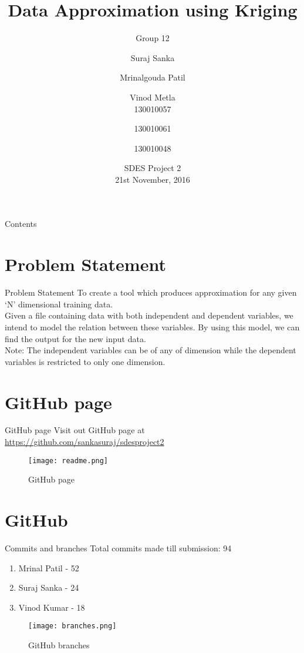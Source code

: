 \documentclass{beamer}
\title[]{Data Approximation using Kriging}
\subtitle{Group 12}
\author[]{Suraj Sanka \and Mrinalgouda Patil \and Vinod Metla\\
		130010057 \hspace{0.5cm} \and 130010061 \hspace{0.5cm} \and 130010048}
\date[]{SDES Project 2 \\ 21st November, 2016}
\begin{document}
\begin{frame}
  \titlepage
\end{frame}

\begin{frame}{Contents}
  \tableofcontents
\end{frame}

\section{Problem Statement}

\begin{frame}{Problem Statement}
\justifying
To create a tool which produces approximation for any given `N' dimensional training data.\\[0.2in]
Given a file containing data with both independent and dependent variables, we intend to model the relation between these variables. By using this model, we can find the output for the new input data.\\[0.4in] 
Note: The independent variables can be of any of dimension while the dependent variables is restricted to only one dimension.
\end{frame}


\section{GitHub page}

\begin{frame}{GitHub page}
Visit out GitHub page at \url{https://github.com/sankasuraj/sdesproject2}
\begin{figure}[H]
	\texttt{[image: readme.png]}
	\caption{GitHub page}
\end{figure}

\end{frame}

\section{GitHub}
\begin{frame}{Commits and branches}
Total commits made till submission: 94
\begin{enumerate}
	\item Mrinal Patil - 52
	\item Suraj Sanka - 24
	\item Vinod Kumar - 18
\end{enumerate}
\begin{figure}[H]
	\texttt{[image: branches.png]}
	\caption{GitHub branches}
\end{figure}
\end{frame}
\end{document}
